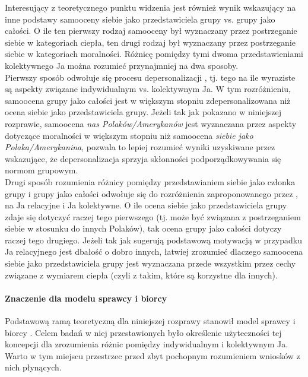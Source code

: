 \documentclass[man]{apa6}
\begin{document}
Interesujący z teoretycznego punktu widzenia jest również wynik wskazujący na inne podstawy samooceny siebie jako przedstawiciela grupy vs. grupy jako całości. O ile ten pierwszy rodzaj samooceny był wyznaczany przez postrzeganie siebie w kategoriach ciepła, ten drugi rodzaj był wyznaczany przez postrzeganie siebie w kategoriach moralności. Różnicę pomiędzy tymi dwoma przedstawieniami kolektywnego Ja można rozumieć przynajmniej na dwa sposoby.\\

Pierwszy sposób odwołuje się procesu depersonalizacji \parencite[np.,][]{turner1987rediscovering}, tj. tego na ile wyraziste są aspekty związane indywidualnym vs. kolektywnym Ja. W tym rozróżnieniu, samoocena grupy jako całości jest w większym stopniu zdepersonalizowana niż ocena siebie jako przedstawiciela grupy. Jeżeli tak jak pokazano w niniejszej rozprawie, samoocena \emph{nas Polaków/Amerykanów} jest wyznaczana przez aspekty dotyczące moralności w większym stopniu niż samoocena \emph{siebie jako Polaka/Amerykanina}, pozwala to lepiej rozumieć wyniki uzyskiwane przez \textcite{reicher1995social} wskazujące, że depersonalizacja sprzyja skłonności podporządkowywania się normom grupowym.\\

Drugi sposób rozumienia różnicy pomiędzy przedstawianiem siebie jako członka grupy i grupy jako całości odwołuje się do rozróżnienia zaproponowanego przez \textcite{brewer1996we}, na Ja relacyjne i Ja kolektywne. O ile ocena siebie jako przedstawiciela grupy zdaje się dotyczyć raczej tego pierwszego (tj. może być związana z postrzeganiem siebie w stosunku do innych Polaków), tak ocena grupy jako całości dotyczy raczej tego drugiego. Jeżeli tak jak sugerują \textcite{brewer1996we} podstawową motywacją w przypadku Ja relacyjnego jest dbałość o dobro innych, łatwiej zrozumieć dlaczego samoocena siebie jako przedstawiciela grupy jest wyznaczana przede wszystkim przez cechy związane z wymiarem ciepła (czyli z takim, które są korzystne dla innych).\\

\paragraph{Znaczenie dla modelu sprawcy i biorcy} Podstawową ramą teoretyczną dla niniejszej rozprawy stanowił model sprawcy i biorcy \parencite{abele2014communal}. Celem badań w niej przestawionych było określenie użyteczności tej koncepcji dla zrozumienia różnic pomiędzy indywidualnym i kolektywnym Ja. Warto w tym miejscu przestrzec przed zbyt pochopnym rozumieniem wniosków z nich płynących.\\
\end{document}
